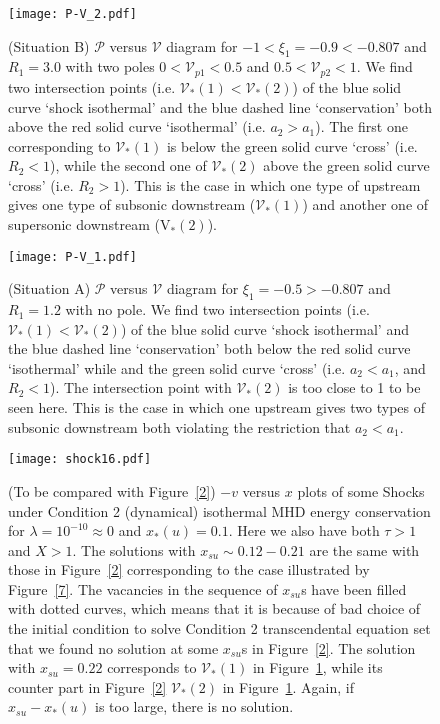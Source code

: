 \documentclass[fleqn,usenatbib]{mnras}
\begin{document}
\begin{figure}
\centering
\texttt{[image: P-V\_2.pdf]}
\caption{(Situation B) $\mathcal{P}$ versus $\mathcal{V}$ diagram for $-1<\xi_{1}=-0.9<-0.807$ and $R_{1}=3.0$ with two poles $0<\mathcal{V}_{p1}<0.5$ and $0.5<\mathcal{V}_{p2}<1$. We find two intersection points (i.e. $\mathcal{V}_{*}(1)<\mathcal{V}_{*}(2)$) of the blue solid curve `shock isothermal' and the blue dashed line `conservation' both above the red solid curve `isothermal' (i.e. $a_{2}>a_{1}$). The first one corresponding to $\mathcal{V}_{*}(1)$ is below the green solid curve `cross' (i.e. $R_{2}<1$), while the second one of $\mathcal{V}_{*}(2)$ above the green solid curve `cross' (i.e. $R_{2}>1$). This is the case in which one type of upstream gives one type of subsonic downstream ($\mathcal{V}_{*}(1)$) and another one of supersonic downstream ($\mathrm{V}_{*}(2)$). }
\label{8}
\end{figure}

\begin{figure}
\centering
\texttt{[image: P-V\_1.pdf]}
\caption{(Situation A) $\mathcal{P}$ versus $\mathcal{V}$ diagram for $\xi_{1}=-0.5>-0.807$ and $R_{1}=1.2$ with no pole. We find two intersection points (i.e. $\mathcal{V}_{*}(1)<\mathcal{V}_{*}(2)$) of the blue solid curve `shock isothermal' and the blue dashed line `conservation' both below the red solid curve `isothermal' while and the green solid curve `cross' (i.e. $a_{2}<a_{1}$, and $R_{2}<1$). The intersection point with $\mathcal{V}_{*}(2)$ is too close to 1 to be seen here. This is the case in which one upstream gives two types of subsonic downstream both violating the restriction that $a_{2}<a_{1}$.}
\label{9}
\end{figure}

\begin{figure}
\centering
\texttt{[image: shock16.pdf]}
\caption{(To be compared with Figure~\ref{2}) $-v$ versus $x$ plots of some Shocks under Condition 2 (dynamical) isothermal MHD energy conservation for $\lambda=10^{-10}\approx 0$ and $x_{*}(u)=0.1$. Here we also have both $\tau>1$ and $X>1$. The solutions with $x_{su}\sim 0.12-0.21$ are the same with those in Figure~\ref{2} corresponding to the case illustrated by Figure~\ref{7}. The vacancies in the sequence of $x_{su}$s have been filled with dotted curves, which means that it is because of bad choice of the initial condition to solve Condition 2 transcendental equation set that we found no solution at some $x_{su}$s in Figure~\ref{2}. The solution with $x_{su}=0.22$ corresponds to $\mathcal{V}_{*}(1)$ in Figure~\ref{8}, while its counter part in Figure~\ref{2} $\mathcal{V}_{*}(2)$ in Figure~\ref{8}. Again, if $x_{su}-x_{*}(u)$ is too large, there is no solution.}
\label{10}
\end{figure}
\end{document}
